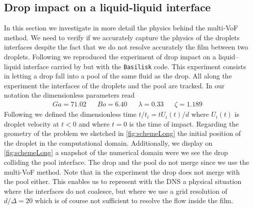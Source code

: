 \documentclass[11pt]{My_preprint}
\begin{document}
\subsection{Drop impact on a liquid-liquid interface}

In this section we investigate in more detail the physics behind the multi-VoF method. 
We need to verify if we accurately capture the physics of the droplets interfaces despite the fact that we do not resolve accurately the film between two droplets. 
Following \citet{balcazar2015multiple} we reproduced the experiment of drop impact on a liquid–liquid interface carried by \citet{mohamed2003drop} but with the \texttt{Basilisk} code. 
This experiment consists in letting a drop fall into a pool of the same fluid as the drop. 
All along the experiment the interfaces of the droplets and the pool are tracked. 
In our notation the dimensionless parameters read 
\begin{align*}
    Ga = 71.02 
    && Bo = 6.40
    && \lambda = 0.33
    && \zeta = 1.189
\end{align*}
Following \citet{mohamed2003drop} we defined the dimensionless time $t / t_i = t U_i(t) /d$ where $U_i(t)$ is droplet velocity at $t<0$ and where $t=0$ is the time of impact. 
Regarding the geometry of the problem we sketched in \ref{fig:schemeLong} the initial position of the droplet in the computational domain.
Additionally, we display on \ref{fig:schemeLong} a snapshot of the numerical domain were we see the drop colliding the pool interface.
The drop and the pool do not merge since we use the multi-VoF method. 
Note that in the experiment the drop does not merge with the pool either.
This enables us to represent with the DNS a physical situation where the interfaces do not coalesce, but where we use a grid resolution of $d/\Delta = 20$ which is of course not sufficient to resolve the flow inside the film. 
\end{document}
